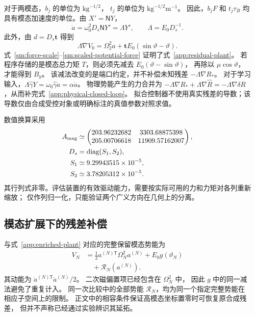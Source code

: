 对于两模态，$b_j$ 的单位为 $\mathrm{kg}^{-1/2}$，
$t_j$ 的单位为 $\mathrm{kg}^{-1/2}\mathrm m^{-1}$。
因此，$b_jF$ 和 $t_j\tau_B$ 均具有模态加速度的单位。由 $X'=\mathsf NY$，
\begin{equation}
 \ddot a=\omega_0^2D_s\mathsf NY'=\Lambda Y',\qquad
 \Lambda=E_0D_s^{-1}.
 \label{sm:force-scale}
\end{equation}
此外，由 $d=D_s\boldsymbol t$ 得到
\begin{equation}
 \Lambda\nabla V_0
 =\Omega_2^2a+\boldsymbol t E_0(\sin\vartheta-\vartheta).
 \label{sm:scaled-potential-force}
\end{equation}
式~\eqref{sm:force-scale}--\eqref{sm:scaled-potential-force} 证明了式~\eqref{app:residual-plant}。
若程序存储的是模态总力矩 $T$，则必须先减去 $E_0(\vartheta-\sin\vartheta)$，
再除以 $\mu\cos\vartheta$，才能得到 $B_y$。
该减法改变的是端口约定，并不补偿未知残差 $-\Lambda\nabla R_*$。
对于学习输入，$\Lambda\widehat\gamma Y=
\omega_0\widehat\gamma\dot a=\widehat\alpha\dot a$。
物理势能产生的力合并为
$-\Lambda\nabla R_*+\Lambda\nabla\widehat R
=-\Lambda\nabla\delta R$，从而补完式~\eqref{app:physical-closed-loop}。
拟合控制器不使用真实残差的导数；该导数仅由合成受控对象或明确标注的真值参数对照求值。



数值换算采用
\begin{align}
 A_{\rm mag}&\simeq
 \begin{pmatrix}
 203.96232682&3303.68875398\\
 205.00706618&11909.57162007
 \end{pmatrix},\nonumber\\
 D_s&=\operatorname{diag}(S_1,S_2),\nonumber\\
 S_1&\simeq9.29943515\times10^{-5},\nonumber\\
 S_2&\simeq3.78205312\times10^{-5}.
 \label{sm:numerical-ports}
\end{align}
其行列式非零。评估装置的有效驱动能力，需要按实际可用的力和力矩对各列重新缩放；
仅作列归一化，只能验证两个广义方向在几何上的分离。

\subsection{模态扩展下的残差补偿}
\label{sm:enriched}
与式~\eqref{app:enriched-plant} 对应的完整保留模态势能为
\begin{align}
 V_N&=\tfrac12a^{(N)\mathsf T}\Omega_N^2a^{(N)}
       +E_0g(\vartheta_N)\nonumber\\
 &\quad+\mathcal R_N(a^{(N)}).
 \label{sm:enriched-potential}
\end{align}
其动能为 $\dot a^{(N)\mathsf T}\dot a^{(N)}/2$。
二次磁偏置项已经包含在 $\Omega_N^2$ 中，
因此 $g$ 中的同一减法避免了重复计入。
同一次比较中的全部势能 $\mathcal R_N$，均为同一个指定完整势能在相应子空间上的限制。
正文中的相容条件保证高模态坐标置零时可恢复原合成残差，
但并不声称已经通过实验辨识其延拓。

